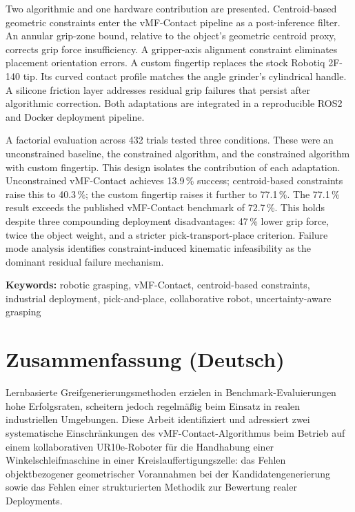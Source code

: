 \documentclass[12pt, a4paper]{report}
\begin{document}
Two algorithmic and one hardware contribution are presented. Centroid-based geometric constraints enter the vMF-Contact pipeline as a post-inference filter. An annular grip-zone bound, relative to the object's geometric centroid proxy, corrects grip force insufficiency. A gripper-axis alignment constraint eliminates placement orientation errors. A custom fingertip replaces the stock Robotiq 2F-140 tip. Its curved contact profile matches the angle grinder's cylindrical handle. A silicone friction layer addresses residual grip failures that persist after algorithmic correction. Both adaptations are integrated in a reproducible ROS2 and Docker deployment pipeline.

A factorial evaluation across 432 trials tested three conditions. These were an unconstrained baseline, the constrained algorithm, and the constrained algorithm with custom fingertip. This design isolates the contribution of each adaptation. Unconstrained vMF-Contact achieves 13.9\,\% success; centroid-based constraints raise this to 40.3\,\%; the custom fingertip raises it further to 77.1\,\%. The 77.1\,\% result exceeds the published vMF-Contact benchmark of 72.7\,\%. This holds despite three compounding deployment disadvantages: 47\,\% lower grip force, twice the object weight, and a stricter pick-transport-place criterion. Failure mode analysis identifies constraint-induced kinematic infeasibility as the dominant residual failure mechanism.

\vspace{0.5cm}
\noindent\textbf{Keywords:} robotic grasping, vMF-Contact, centroid-based constraints, industrial deployment, pick-and-place, collaborative robot, uncertainty-aware grasping

\vspace{1cm}
\section*{Zusammenfassung (Deutsch)}

Lernbasierte Greifgenerierungsmethoden erzielen in Benchmark-Evaluierungen hohe Erfolgsraten, scheitern jedoch regelmäßig beim Einsatz in realen industriellen Umgebungen. Diese Arbeit identifiziert und adressiert zwei systematische Einschränkungen des vMF-Contact-Algorithmus beim Betrieb auf einem kollaborativen UR10e-Roboter für die Handhabung einer Winkelschleifmaschine in einer Kreislauffertigungszelle: das Fehlen objektbezogener geometrischer Vorannahmen bei der Kandidatengenerierung sowie das Fehlen einer strukturierten Methodik zur Bewertung realer Deployments.
\end{document}
